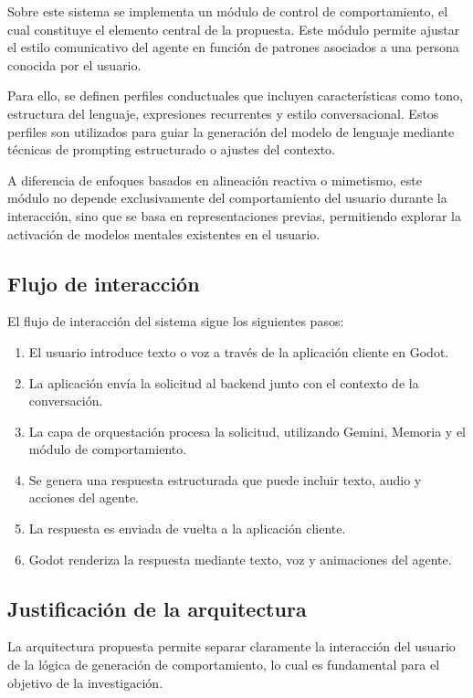 \documentclass[12pt]{article}
\begin{document}
Sobre este sistema se implementa un módulo de control de comportamiento, el cual constituye el elemento central de la propuesta. Este módulo permite ajustar el estilo comunicativo del agente en función de patrones asociados a una persona conocida por el usuario.

Para ello, se definen perfiles conductuales que incluyen características como tono, estructura del lenguaje, expresiones recurrentes y estilo conversacional. Estos perfiles son utilizados para guiar la generación del modelo de lenguaje mediante técnicas de prompting estructurado o ajustes del contexto.

A diferencia de enfoques basados en alineación reactiva o mimetismo, este módulo no depende exclusivamente del comportamiento del usuario durante la interacción, sino que se basa en representaciones previas, permitiendo explorar la activación de modelos mentales existentes en el usuario.

\subsection{Flujo de interacción}

El flujo de interacción del sistema sigue los siguientes pasos:

\begin{enumerate}
    \item El usuario introduce texto o voz a través de la aplicación cliente en Godot.
    \item La aplicación envía la solicitud al backend junto con el contexto de la conversación.
    \item La capa de orquestación procesa la solicitud, utilizando Gemini, Memoria y el módulo de comportamiento.
    \item Se genera una respuesta estructurada que puede incluir texto, audio y acciones del agente.
    \item La respuesta es enviada de vuelta a la aplicación cliente.
    \item Godot renderiza la respuesta mediante texto, voz y animaciones del agente.
\end{enumerate}

\subsection{Justificación de la arquitectura}

La arquitectura propuesta permite separar claramente la interacción del usuario de la lógica de generación de comportamiento, lo cual es fundamental para el objetivo de la investigación.
\end{document}
